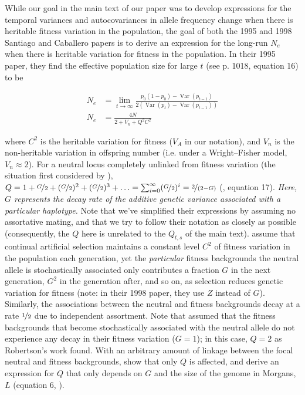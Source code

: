\documentclass[11pt]{article}
\newcommand{\vb}[1]{{\it \color{blue} #1}}
\DeclareMathOperator{\var}{Var}
\begin{document}
While our goal in the main text of our paper was to develop expressions for the
temporal variances and autocovariances in allele frequency change when there is
heritable fitness variation in the population, the goal of both the 1995 and
1998 Santiago and Caballero papers is to derive an expression for the long-run
$N_e$ when there is heritable variation for fitness in the population. In their
1995 paper, they find the effective population size for large $t$ (see p. 1018,
equation 16) to be

\begin{align}
  N_e &= \lim_{t \to \infty} \frac{p_0(1-p_0) - \var(p_{t-1})}{2(\var(p_t) - \var(p_{t-1}))}  \\
  N_e &= \frac{4N}{2 + V_n + Q^2 C^2}
\end{align}
%

where $C^2$ is the heritable variation for fitness ($V_A$ in our notation), and
$V_n$ is the non-heritable variation in offspring number (i.e. under a
Wright--Fisher model, $V_n \approx 2$). For a neutral locus completely unlinked
from fitness variation (the situation first considered by
\cite{Robertson1961-ho}), $Q = 1 + \nicefrac{G}{2} + (\nicefrac{G}{2})^2 +
(\nicefrac{G}{2})^3 + \ldots = \sum_{i=0}^\infty (\nicefrac{G}{2})^i =
\nicefrac{2}{(2 - G)}$ (\cite{Santiago1995-hx}, equation 17). \vb{Here, $G$
represents the decay rate of the additive genetic variance associated with a
particular haplotype.} Note that we've simplified their expressions by assuming
no assortative mating, and that we try to follow their notation as closely as
possible (consequently, the $Q$ here is unrelated to the $Q_{t,s}$ of the main
text).  \textcite{Santiago1995-hx} assume that continual artificial selection
maintains a constant level $C^2$ of fitness variation in the population each
generation, yet the \emph{particular} fitness backgrounds the neutral allele is
stochastically associated only contributes a fraction $G$ in the next
generation, $G^2$ in the generation after, and so on, as selection reduces
genetic variation for fitness (note: in their 1998 paper, they use $Z$ instead
of $G$). Similarly, the associations between the neutral and fitness
backgrounds decay at a rate $\nicefrac{1}{2}$ due to independent assortment.
Note that \textcite{Robertson1961-ho} assumed that the fitness backgrounds that
become stochastically associated with the neutral allele do not experience any
decay in their fitness variation ($G=1$); in this case, $Q = 2$ as Robertson's
work found. With an arbitrary amount of linkage between the focal neutral and
fitness backgrounds, \textcite{Santiago1998-bs} show that only $Q$ is affected,
and derive an expression for $Q$ that only depends on $G$ and the size of the
genome in Morgans, $L$ (equation 6, \citeyear{Santiago1998-bs}). 
\end{document}
